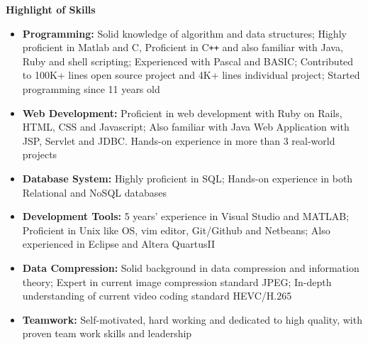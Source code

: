 \documentclass[letterpaper,10pt]{article}
\newcommand{\resheading}[1]{{\large \colorbox{mygrey}{\begin{minipage}{\textwidth}{\textbf{#1 \vphantom{p\^{E}}}}\end{minipage}}}}
\begin{document}
\resheading{Highlight of Skills}
\begin{itemize}
\itemsep0em
\item {\textbf {Programming:}} Solid knowledge of algorithm and data structures; Highly proficient in Matlab and C, Proficient in C{}\verb!++! and also familiar with Java, Ruby and shell scripting; Experienced with Pascal and BASIC; Contributed to 100K+ lines open source project and 4K+ lines individual project; Started programming since 11 years old
\item{\textbf {Web Development:}} Proficient in web development with Ruby on Rails, HTML, CSS and Javascript; Also familiar with Java Web Application with JSP, Servlet and JDBC. Hands-on experience in more than 3 real-world projects
\item{\textbf {Database System:}} Highly proficient in SQL; Hands-on experience in both Relational and NoSQL databases
\item{\textbf {Development Tools:}} 5 years' experience in Visual Studio and MATLAB; Proficient in Unix like OS, vim editor, Git/Github and Netbeans; Also experienced in Eclipse and Altera QuartusII
\item{\textbf {Data Compression:}} Solid background in data compression and information theory; Expert in current image compression standard JPEG; In-depth understanding of current video coding standard HEVC/H.265
\item{\textbf {Teamwork:}} Self-motivated, hard working and dedicated to high quality, with proven team work skills and leadership

\end{itemize}
\end{document}
